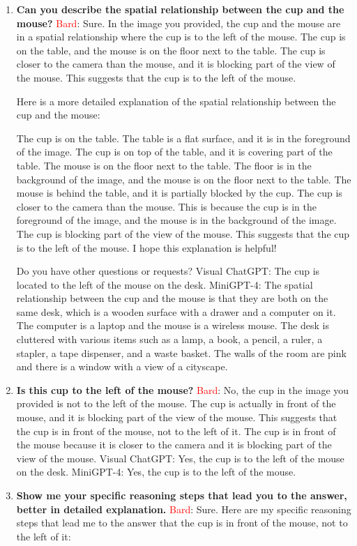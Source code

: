 \begin{enumerate}
    \item \textbf{Can you describe the spatial relationship between the cup and the mouse?}
    \subitem \textcolor{Red}{Bard}:
    Sure. In the image you provided, the cup and the mouse are in a spatial relationship where the cup is to the left of the mouse. The cup is on the table, and the mouse is on the floor next to the table. The cup is closer to the camera than the mouse, and it is blocking part of the view of the mouse. This suggests that the cup is to the left of the mouse.

    Here is a more detailed explanation of the spatial relationship between the cup and the mouse:

    The cup is on the table. The table is a flat surface, and it is in the foreground of the image. The cup is on top of the table, and it is covering part of the table.
    The mouse is on the floor next to the table. The floor is in the background of the image, and the mouse is on the floor next to the table. The mouse is behind the table, and it is partially blocked by the cup.
    The cup is closer to the camera than the mouse. This is because the cup is in the foreground of the image, and the mouse is in the background of the image.
    The cup is blocking part of the view of the mouse. This suggests that the cup is to the left of the mouse.
    I hope this explanation is helpful!

    Do you have other questions or requests?
    \subitem Visual ChatGPT: The cup is located to the left of the mouse on the desk.
    \subitem MiniGPT-4: The spatial relationship between the cup and the mouse is that they are both on the same desk, which is a wooden surface with a drawer and a computer on it. The computer is a laptop and the mouse is a wireless mouse. The desk is cluttered with various items such as a lamp, a book, a pencil, a ruler, a stapler, a tape dispenser, and a waste basket. The walls of the room are pink and there is a window with a view of a cityscape.
    \item \textbf{Is this cup to the left of the mouse?}
    \subitem \textcolor{Red}{Bard}: 
    No, the cup in the image you provided is not to the left of the mouse. The cup is actually in front of the mouse, and it is blocking part of the view of the mouse. This suggests that the cup is in front of the mouse, not to the left of it. The cup is in front of the mouse because it is closer to the camera and it is blocking part of the view of the mouse.
    \subitem Visual ChatGPT: Yes, the cup is to the left of the mouse on the desk.
    \subitem MiniGPT-4: Yes, the cup is to the left of the mouse.
    \item \textbf{Show me your specific reasoning steps that lead you to the answer, better in detailed explanation.}
    \subitem \textcolor{Red}{Bard}: 
    Sure. Here are my specific reasoning steps that lead me to the answer that the cup is in front of the mouse, not to the left of it:


\end{enumerate}

